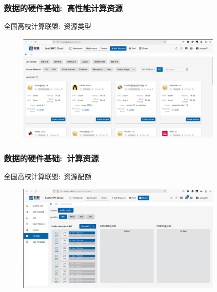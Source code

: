 \frame
{
	\frametitle{数据的硬件基础:~高性能计算资源}
全国高校计算联盟:~资源类型
\begin{figure}[h!]
\vspace*{-0.15in}
\centering
\includegraphics[height=2.15in,width=4.05in,viewport=0 0 1527 797,clip]{Figures/Eaas-HPC-Cloud.png}
\label{Eaas-HPC-Cloud}
\end{figure}
}

\frame
{
	\frametitle{数据的硬件基础:~计算资源}
全国高校计算联盟:~资源配额
\begin{figure}[h!]
\vspace*{-0.15in}
\centering
\includegraphics[height=2.15in,width=4.05in,viewport=0 0 1529 799,clip]{Figures/Eaas-HPC-Cloud-resource.png}
\label{Eaas-HPC-Cloud-resource}
\end{figure}
}


